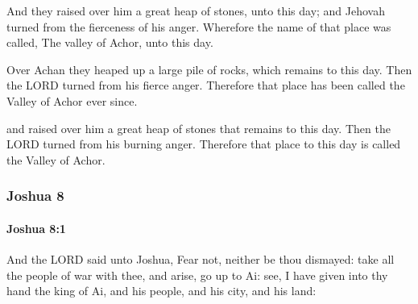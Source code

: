 			\begin{versebox}
					\item[BHS] 
					\item[ASV] And they raised over him a great heap of stones, unto this day; and Jehovah turned from the fierceness of his anger. Wherefore the name of that place was called, The valley of Achor, unto this day.
					\item[NIV] Over Achan they heaped up a large pile of rocks, which remains to this day. Then the LORD turned from his fierce anger. Therefore that place has been called the Valley of Achor ever since.
					\item[NRSV] and raised over him a great heap of stones that remains to this day. Then the LORD turned from his burning anger. Therefore that place to this day is called the Valley of Achor.
			\end{versebox}
	\subsubsection{Joshua 8} %
		\label{JOSHUA-8}

		\paragraph{Joshua 8:1} %
			\label{JOSHUA-8-1}

			And the LORD said unto Joshua, Fear not, neither be thou dismayed: take all the people of war with thee, and arise, go up to Ai: see, I have given into thy hand the king of Ai, and his people, and his city, and his land:

